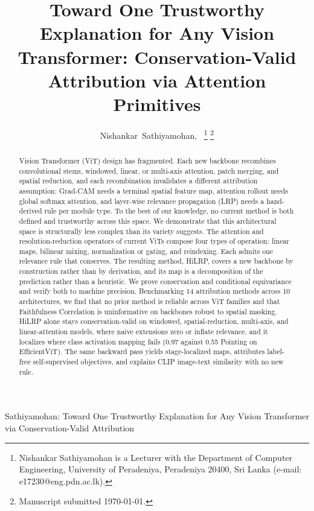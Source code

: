\documentclass[lettersize,journal]{IEEEtran}
\theoremstyle{definition}
\theoremstyle{plain}
\begin{document}

\title{Toward One Trustworthy Explanation for Any Vision Transformer: Conservation-Valid Attribution via Attention Primitives}

\author{Nishankar~Sathiyamohan,~%
  \thanks{Nishankar Sathiyamohan is a Lecturer with the Department of Computer
  Engineering, University of Peradeniya, Peradeniya 20400, Sri Lanka
  (e-mail: e17230@eng.pdn.ac.lk).}%
  \thanks{Manuscript submitted \today.}}

%
         {Sathiyamohan: Toward One Trustworthy Explanation for Any Vision Transformer via Conservation-Valid Attribution}

\maketitle

\begin{abstract}
Vision Transformer (ViT) design has fragmented. Each new backbone recombines convolutional stems, windowed, linear, or multi-axis attention, patch merging, and spatial reduction, and each recombination invalidates a different attribution assumption: Grad-CAM needs a terminal spatial feature map, attention rollout needs global softmax attention, and layer-wise relevance propagation (LRP) needs a hand-derived rule per module type. To the best of our knowledge, no current method is both defined and trustworthy across this space. We demonstrate that this architectural space is structurally less complex than its variety suggests. The attention and resolution-reduction operators of current ViTs compose four types of operation: linear maps, bilinear mixing, normalization or gating, and reindexing. Each admits one relevance rule that conserves. The resulting method, HiLRP, covers a new backbone by construction rather than by derivation, and its map is a decomposition of the prediction rather than a heuristic. We prove conservation and conditional equivariance and verify both to machine precision. Benchmarking 14 attribution methods across 10 architectures, we find that no prior method is reliable across ViT families and that Faithfulness Correlation is uninformative on backbones robust to spatial masking. HiLRP alone stays conservation-valid on windowed, spatial-reduction, multi-axis, and linear-attention models, where naive extensions zero or inflate relevance, and it localizes where class activation mapping fails (0.97 against 0.55 Pointing on EfficientViT). The same backward pass yields stage-localized maps, attributes label-free self-supervised objectives, and explains CLIP image-text similarity with no new rule.
\end{abstract}
\end{document}
